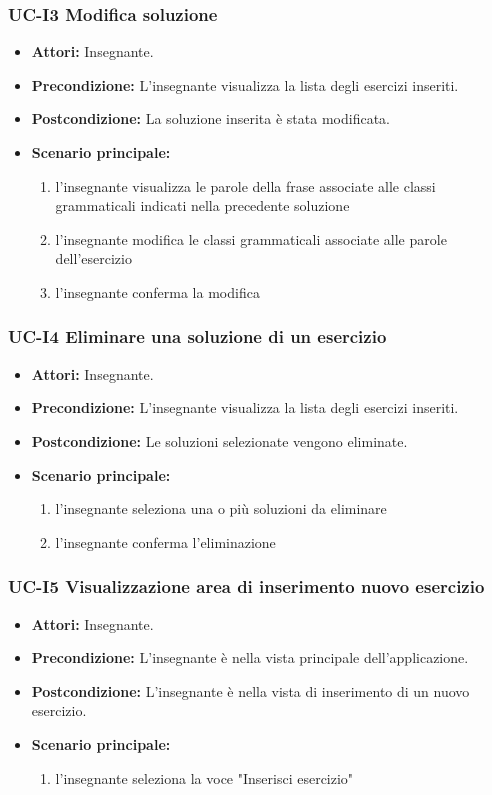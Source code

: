 \subsubsection{UC-I3 Modifica soluzione}
\begin{itemize}
	\item \textbf{Attori:} Insegnante.
	\item \textbf{Precondizione:} L'insegnante visualizza la lista degli esercizi inseriti.
	\item \textbf{Postcondizione:} La soluzione inserita è stata modificata.
	\item \textbf{Scenario principale:}
		\begin{enumerate}
		\item l'insegnante visualizza le parole della frase associate alle classi grammaticali indicati nella precedente soluzione
		\item l'insegnante modifica le classi grammaticali associate alle parole dell'esercizio
		\item l'insegnante conferma la modifica
		\end{enumerate}
\end{itemize}
	
\subsubsection{UC-I4 Eliminare una soluzione di un esercizio}
\begin{itemize}
	\item \textbf{Attori:} Insegnante.
	\item \textbf{Precondizione:} L'insegnante visualizza la lista degli esercizi inseriti.
	\item \textbf{Postcondizione:} Le soluzioni selezionate vengono eliminate.
	\item \textbf{Scenario principale:}
		\begin{enumerate}
			\item l'insegnante seleziona una o più soluzioni da eliminare
			\item l'insegnante conferma l'eliminazione
		\end{enumerate}
\end{itemize}

\subsubsection{UC-I5 Visualizzazione area di inserimento nuovo esercizio}
\begin{itemize}
		\item \textbf{Attori: }Insegnante.
		\item \textbf{Precondizione: }L'insegnante è nella vista principale dell'applicazione.
		\item \textbf{Postcondizione: }L'insegnante è nella vista di inserimento di un nuovo esercizio.
		\item \textbf{Scenario principale: }
	\begin{enumerate} 
		\item l'insegnante seleziona la voce "Inserisci esercizio"
	\end{enumerate}
\end{itemize}

